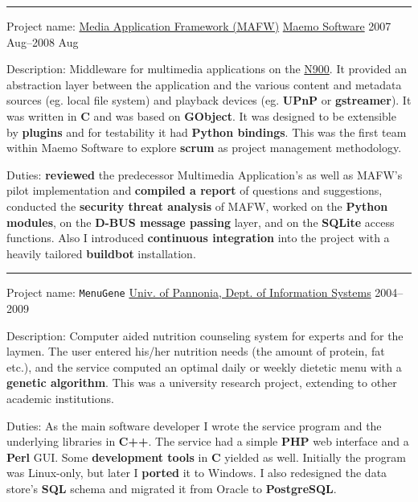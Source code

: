 \documentclass[a4paper,12pt]{article}
\newcommand\Yell{\textbf}
\newcommand\Label{\textsf}
\newcommand{\midline}{\rule[0.5ex]{\linewidth-\parindent}{.5pt}}
\begin{document}
\midline\par
\Label{Project name}: \href{http://wiki.maemo.org/Documentation/Maemo_5_Developer_Guide/Using_Multimedia_Components/Media_Application_Framework_(MAFW)}{Media Application Framework (MAFW)}\hfill
\hyperlink{Maemo}{Maemo Software} \Label{2007 Aug--2008 Aug}\par\medskip
\Label{Description}: Middleware for multimedia applications on the
\hyperlink{gadgets}{N900}.  It provided an abstraction layer between
the application and the various content and metadata sources (eg. local
file system) and playback devices (eg. \Yell{UPnP} or \Yell{gstreamer}).
It was written in \Yell{C} and was based on \Yell{GObject}.  It was
designed to be extensible by \Yell{plugins} and for testability it had
\Yell{Python bindings}.  This was the first team within Maemo Software
to explore \Yell{scrum} as project management methodology.\par\medskip
\Label{Duties}: \Yell{reviewed} the predecessor Multimedia Application's
as well as MAFW's pilot implementation and \Yell{compiled a report} of
questions and suggestions, conducted the \Yell{security threat analysis}
of MAFW, worked on the \Yell{Python modules}, on the \Yell{D-BUS message
passing} layer, and on the \Yell{SQLite} access functions.  Also I introduced
\Yell{continuous integration} into the project with a heavily tailored
\Yell{buildbot} installation.

\midline\par
\Label{Project name}: \texttt{MenuGene}\hfill
\href{http://virt.uni-pannon.hu/index.php/about-the-department}%
{Univ. of Pannonia, Dept. of Information Systems}
\Label{2004--2009}\par\medskip
\Label{Description}: Computer aided nutrition counseling system for experts
and for the laymen.  The user entered his/her nutrition needs (the amount
of protein, fat etc.), and the service computed an optimal daily or weekly 
dietetic menu with a \Yell{genetic algorithm}.  This was a university
research project, extending to other academic institutions.\par\medskip
\Label{Duties}: As the main software developer I wrote the service program
and the underlying libraries in \Yell{C++}.  The service had a simple
\Yell{PHP} web interface and a \Yell{Perl} GUI.  Some \Yell{development
tools} in \Yell{C} yielded as well.  Initially the program was Linux-only,
but later I \Yell{ported} it to Windows.  I also redesigned the data store's
\Yell{SQL} schema and migrated it from Oracle to \Yell{PostgreSQL}.
\end{document}
